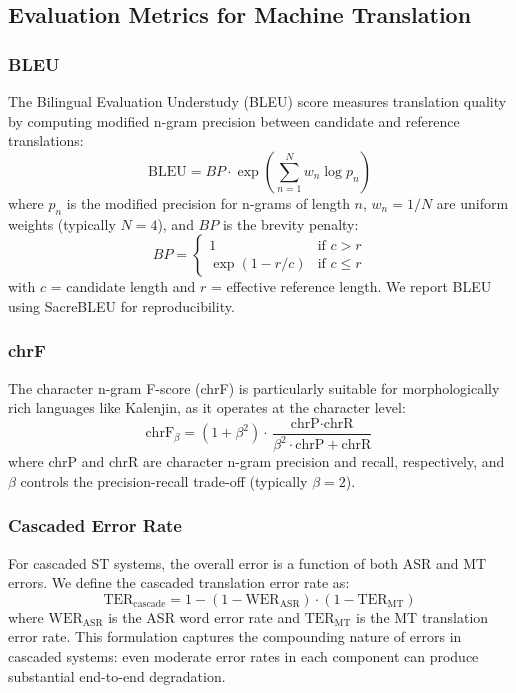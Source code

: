 \documentclass[conference]{IEEEtran}
\begin{document}
\subsection{Evaluation Metrics for Machine Translation}

\subsubsection{BLEU}
The Bilingual Evaluation Understudy (BLEU) score \cite{papineni2002bleu} measures translation quality by computing modified n-gram precision between candidate and reference translations:
\begin{equation}
\text{BLEU} = BP \cdot \exp\left(\sum_{n=1}^{N} w_n \log p_n\right)
\label{eq:bleu}
\end{equation}
where $p_n$ is the modified precision for n-grams of length $n$, $w_n = 1/N$ are uniform weights (typically $N=4$), and $BP$ is the brevity penalty:
\begin{equation}
BP = \begin{cases} 1 & \text{if } c > r \\ \exp(1 - r/c) & \text{if } c \leq r \end{cases}
\label{eq:bp}
\end{equation}
with $c$ = candidate length and $r$ = effective reference length. We report BLEU using SacreBLEU \cite{post2018sacrebleu} for reproducibility.

\subsubsection{chrF}
The character n-gram F-score (chrF) \cite{popovic2015chrf} is particularly suitable for morphologically rich languages like Kalenjin, as it operates at the character level:
\begin{equation}
\text{chrF}_\beta = (1 + \beta^2) \cdot \frac{\text{chrP} \cdot \text{chrR}}{\beta^2 \cdot \text{chrP} + \text{chrR}}
\label{eq:chrf}
\end{equation}
where chrP and chrR are character n-gram precision and recall, respectively, and $\beta$ controls the precision-recall trade-off (typically $\beta = 2$).

\subsubsection{Cascaded Error Rate}
For cascaded ST systems, the overall error is a function of both ASR and MT errors. We define the cascaded translation error rate as:
\begin{equation}
\text{TER}_{\text{cascade}} = 1 - (1 - \text{WER}_{\text{ASR}}) \cdot (1 - \text{TER}_{\text{MT}})
\label{eq:cascade_error}
\end{equation}
where $\text{WER}_{\text{ASR}}$ is the ASR word error rate and $\text{TER}_{\text{MT}}$ is the MT translation error rate. This formulation captures the compounding nature of errors in cascaded systems: even moderate error rates in each component can produce substantial end-to-end degradation.
\end{document}
